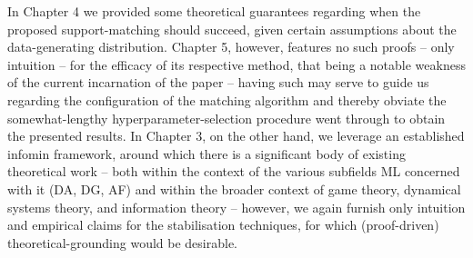 %
%
In Chapter 4 we provided some theoretical guarantees regarding when the proposed support-matching
should succeed, given certain assumptions about the data-generating distribution.
%
Chapter 5, however, features no such proofs -- only intuition -- for the efficacy of its respective
method, that being a notable weakness of the current incarnation of the paper -- having such may
serve to guide us regarding the configuration of the matching algorithm and thereby obviate the
somewhat-lengthy hyperparameter-selection procedure went through to obtain the presented results.
%
In Chapter 3, on the other hand, we leverage an established infomin framework, around which there
is a significant body of existing theoretical work -- both within the context of the various
subfields ML concerned with it (DA, DG, AF) and within the broader context of game theory,
dynamical systems theory, and information theory -- however, we again furnish only intuition and
empirical claims for the stabilisation techniques, for which (proof-driven) theoretical-grounding
would be desirable.

%

